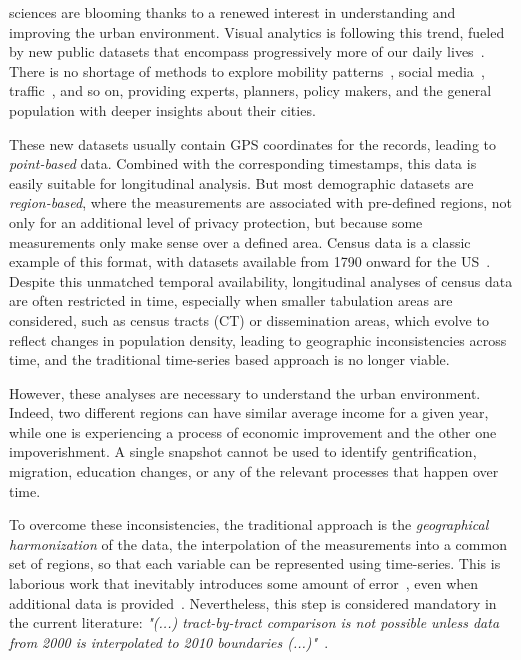  sciences are blooming thanks to a renewed interest in
understanding and improving the urban environment. Visual analytics is following
this trend, fueled by new public datasets that encompass progressively more of
our daily lives~\cite{Chen2017}. There is no shortage of methods to explore
mobility patterns~\cite{VonLandesberger2016}, social media~\cite{Chen2017},
traffic~\cite{chen2015survey}, and so on, providing experts, planners, policy
makers, and the general population with deeper insights about their cities.


These new datasets usually contain GPS coordinates for the records, leading to
\emph{point-based} data. Combined with the corresponding timestamps, this data
is easily suitable for longitudinal analysis. But most demographic datasets are
\emph{region-based}, where the measurements are associated with pre-defined
regions, not only for an additional level of privacy protection, but because
some measurements only make sense over a defined area. Census data is a classic
example of this format, with datasets available from 1790 onward for the
US~\cite{nhgis}. Despite this unmatched temporal availability, longitudinal
analyses of census data are often restricted in time, especially when smaller
tabulation areas are considered, such as census tracts (CT) or dissemination
areas, which evolve to reflect changes in population density, leading to
geographic inconsistencies across time, and the traditional time-series based
approach is no longer viable. 


However, these analyses are necessary to understand the urban environment.
Indeed, two different regions can have similar average income for a given year,
while one is experiencing a process of economic improvement and the other one
impoverishment. A single snapshot cannot be used to identify gentrification,
migration, education changes, or any of the relevant processes that happen over
time.


To overcome these inconsistencies, the traditional approach is the
\emph{geographical harmonization} of the data, the interpolation of the
measurements into a common set of
regions\cite{Logan2014,Hallisey2017,Allen2018}, so that each variable can be
represented using time-series. This is laborious work that inevitably introduces
some amount of error~\cite{Logan2016}, even when additional data is
provided~\cite{eicher2001dasymetric}. Nevertheless, this step is considered
mandatory in the current literature: \emph{"(...) tract-by-tract comparison is
not possible unless data from 2000 is interpolated to 2010 boundaries
(...)"}~\cite{Dmowska2017}.




